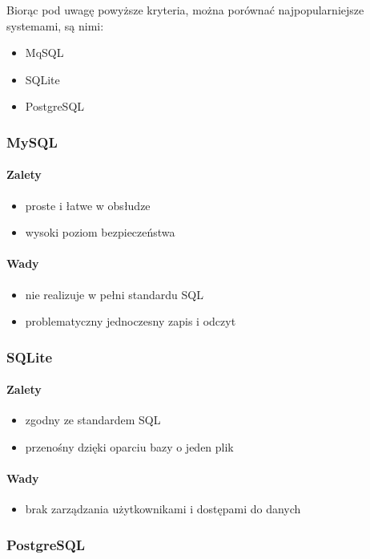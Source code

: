 \documentclass[a4paper,12pt,twoside]{article}
\begin{document}
\newpage
Biorąc pod uwagę powyższe kryteria, można porównać najpopularniejsze systemami, są nimi\cite{porownanieBaz}: 
 \begin{itemize}
  \item MqSQL
  \item SQLite
  \item PostgreSQL
\end{itemize}

\subsubsection{MySQL}
\paragraph{Zalety}
\begin{itemize}
\item{proste i łatwe w obsłudze}
\item{wysoki poziom bezpieczeństwa}
\end{itemize}
\paragraph{Wady}
\begin{itemize}
\item{nie realizuje w pełni standardu SQL}
\item{problematyczny jednoczesny zapis i odczyt}
\end{itemize}
\subsubsection{SQLite}
\paragraph{Zalety}
\begin{itemize}
\item{zgodny ze standardem SQL}
\item{przenośny dzięki oparciu bazy o jeden plik}
\end{itemize}
\paragraph{Wady}
\begin{itemize}
\item{brak zarządzania użytkownikami i dostępami do danych}
\end{itemize}

\subsubsection{PostgreSQL}
\end{document}
